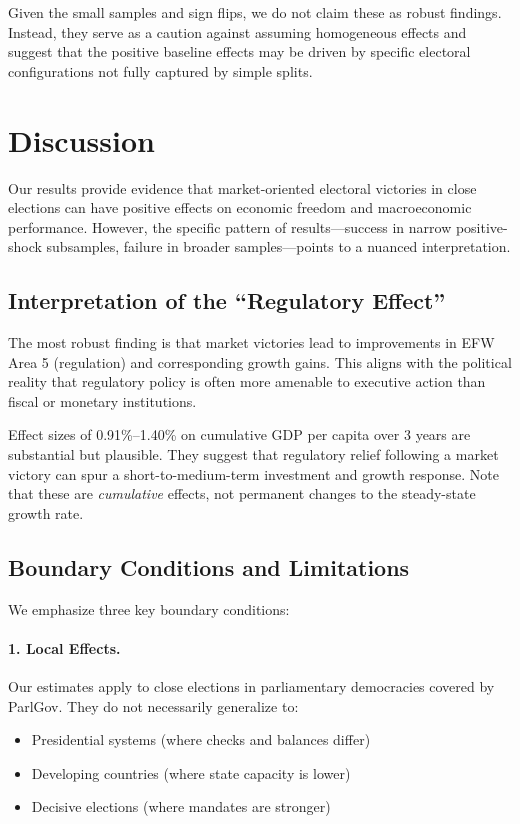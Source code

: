 \documentclass[12pt,a4paper]{article}
\begin{document}
Given the small samples and sign flips, we do not claim these as robust 
findings. Instead, they serve as a caution against assuming homogeneous 
effects and suggest that the positive baseline effects may be driven by 
specific electoral configurations not fully captured by simple splits.


\section{Discussion}
\label{sec:discussion}

Our results provide evidence that market-oriented electoral victories in 
close elections can have positive effects on economic freedom and 
macroeconomic performance. However, the specific pattern of results---success 
in narrow positive-shock subsamples, failure in broader samples---points 
to a nuanced interpretation.

\subsection{Interpretation of the ``Regulatory Effect''}

The most robust finding is that market victories lead to improvements 
in EFW Area 5 (regulation) and corresponding growth gains. This aligns 
with the political reality that regulatory policy is often more amenable 
to executive action than fiscal or monetary institutions.

Effect sizes of 0.91\%--1.40\% on cumulative GDP per capita over 3 years 
are substantial but plausible. They suggest that regulatory relief 
following a market victory can spur a short-to-medium-term investment 
and growth response. Note that these are \textit{cumulative} effects, 
not permanent changes to the steady-state growth rate.

\subsection{Boundary Conditions and Limitations}

We emphasize three key boundary conditions:

\paragraph{1. Local Effects.}
Our estimates apply to close elections in parliamentary democracies 
covered by ParlGov. They do not necessarily generalize to:
\begin{itemize}[noitemsep]
    \item Presidential systems (where checks and balances differ)
    \item Developing countries (where state capacity is lower)
    \item Decisive elections (where mandates are stronger)
\end{itemize}
\end{document}
